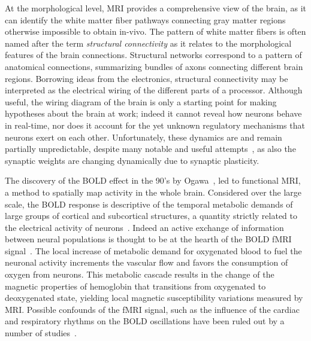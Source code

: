 At the morphological level, MRI provides a comprehensive view of the brain, as it can identify the white matter fiber pathways connecting gray matter regions otherwise impossible to obtain in-vivo.
The pattern of white matter fibers is often named after the term \emph{structural connectivity} as it relates to the morphological features of the brain connections.
Structural networks correspond to a pattern of anatomical connections, summarizing bundles of axons connecting different brain regions.
Borrowing ideas from the electronics, structural connectivity may be interpreted as the electrical wiring of the different parts of a processor.
Although useful, the wiring diagram of the brain is only a starting point for making hypotheses about the brain at work; indeed it cannot reveal how neurons behave in real-time, nor does it account for the yet unknown regulatory mechanisms that neurons exert on each other.
Unfortunately, these dynamics are and remain partially unpredictable, despite many notable and useful attempts~\cite{deco2008}, as also the synaptic weights are changing dynamically due to synaptic plasticity.

The discovery of the BOLD effect in the 90's by Ogawa~\cite{ogawa1990}, led to functional MRI, a method to spatially map activity in the whole brain.
Considered over the large scale, the BOLD response is descriptive of the temporal metabolic demands of large groups of cortical and subcortical structures, a quantity strictly related to the electrical activity of neurons~\cite{logothetis2001}.
Indeed an active exchange of information between neural populations is thought to be at the hearth of the BOLD fMRI signal~\cite{logothetis2001}.
The local increase of metabolic demand for oxygenated blood to fuel the neuronal activity increments the vascular flow and favors the consumption of oxygen from neurons.
This metabolic cascade results in the change of the magnetic properties of hemoglobin that transitions from oxygenated to deoxygenated state, yielding local magnetic susceptibility variations measured by MRI.
Possible confounds of the fMRI signal, such as the influence of the cardiac and respiratory rhythms on the BOLD oscillations have been ruled out by a number of studies~\cite{cordes2000,cordes2001,logothetis2001,shmuel2002}.

